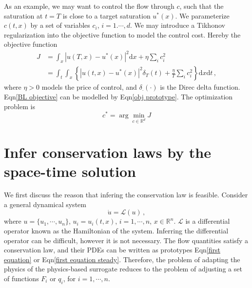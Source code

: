 \documentclass[a4paper,onecolumn]{article}
\theoremstyle{remark}
\begin{document}
\noindent As an example, we may
want to control the flow through $c$, such that the saturation at $t=T$ is close to 
a target saturation $u^*(x)$. 
We parameterize $c(t,x)$ by a set of variables $c_i$, $i=1.\cdots, d$.
We may introduce a Tikhonov regularization into the objective function 
to model the control cost.
Hereby the objective function
\begin{equation}\begin{split}
    J &= \int_x \left|u(T,x) - u^*(x)\right|^2 \textrm{d}x + \eta \sum_i c_i^2\\
      &= \int_t \int_x \left\{ \left|u(t,x) - u^*(x)\right|^2 \delta_T(t) + \frac{\eta}{T} \sum_i c_i^2 \right\}
      \textrm{d}x \textrm{d}t \,,
\end{split} \label{BL objective}
\end{equation}
where $\eta>0$ models the price of control, and $\delta_\cdot(\cdot)$ is the Direc delta function.
Eqn\eqref{BL objective} can be modelled by Eqn\eqref{obj prototype}.
The optimization problem is
\begin{equation}
    c^* = \arg\min_{c\in \mathbb{R}^d} J
\end{equation}

\section{Infer conservation laws by the space-time solution}
\label{infer}
\noindent We first discuss the reason that infering the conservation law is feasible.
Consider a general dynamical system
\begin{equation}
    \dot{u} = \mathcal{L}(u)\,,
    \label{general equation}
\end{equation}
where $u=\{u_1,\cdots, u_n\}$, $u_i = u_i(t,x)$, $i=1,\cdots,n$, $x\in \mathbb{R}^n$.
$\mathcal{L}$ is a differential operator known as the Hamiltonian of the system.
Inferring the differential operator can be difficult, however it is not necessary.
The flow quantities satisfy a conservation law, and their PDEs 
can be written as prototypes Eqn\eqref{first equation}
or Eqn\eqref{first equation steady}.
Therefore, the problem of adapting the physics of the physics-based surrogate reduces to the
problem of adjusting a set of functions $F_i$ or
$q_i$, for $i=1,\cdots,n$. \\
\end{document}
